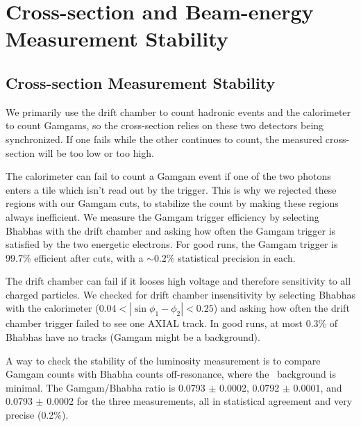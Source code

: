 \documentclass[aps,prd,preprint,superscriptaddress,tightenlines,nofootinbib,floatfix]{revtex4}
\begin{document}
%
\section{Cross-section and Beam-energy Measurement Stability}
%

%
\subsection{Cross-section Measurement Stability} \label{sec:csstab}
%

We primarily use the drift chamber to count hadronic events and the
calorimeter to count Gamgams, so the cross-section relies on these two
detectors being synchronized.  If one fails while the other continues to count,
the measured cross-section will be too low or too high.

The calorimeter can fail to count a Gamgam event if one of the two
photons enters a tile which isn't read out by the trigger.  This is
why we rejected these regions with our Gamgam cuts, to stabilize the
count by making these regions always inefficient.  We measure the
Gamgam trigger efficiency by selecting Bhabhas with the drift chamber
and asking how often the Gamgam trigger is satisfied by the two
energetic electrons.  For good runs, the Gamgam trigger is 99.7\%
efficient after cuts, with a $\sim$0.2\% statistical precision in each.

The drift chamber can fail if it looses high voltage and therefore
sensitivity to all charged particles.  We checked for drift chamber
insensitivity by selecting Bhabhas with the calorimeter ($0.04 < |\sin
\phi_1 - \phi_2| < 0.25$) and asking how often the drift chamber
trigger failed to see one AXIAL track.  In good runs, at most 0.3\% of
Bhabhas have no tracks (Gamgam might be a background).

A way to check the stability of the luminosity measurement is to
compare Gamgam counts with Bhabha counts off-resonance, where the
\ups\ background is minimal.  The Gamgam/Bhabha ratio is 0.0793 $\pm$
0.0002, 0.0792 $\pm$ 0.0001, and 0.0793 $\pm$ 0.0002 for the three
measurements, all in statistical agreement and very precise (0.2\%).
\end{document}
